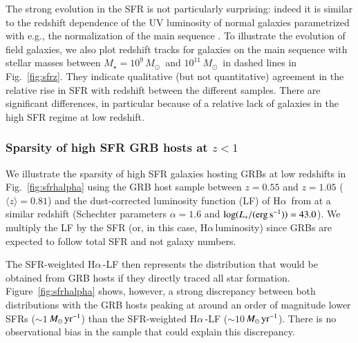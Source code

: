 \documentclass[traditabstract, longauth]{aa}
\newcommand{\ha}{H$\alpha$}
\newcommand{\Msun}{$M_\odot$}
\newcommand{\Msunyr}{$M_\odot\,\rm{yr}^{-1}$}
\begin{document}
The strong evolution in the SFR is not particularly surprising: indeed it is similar to the redshift dependence of the UV luminosity of normal galaxies parametrized with e.g., the normalization of the main sequence \citep[e.g.,][]{2011ApJ...742...96W, 2012ApJ...754L..29W}. To illustrate the evolution of field galaxies, we also plot redshift tracks for galaxies {on the main sequence} with stellar masses between $M_{\star}=10^{9}$\,\Msun\, and $10^{11}$\,\Msun\, in dashed lines in Fig.~\ref{fig:sfrz}. They indicate qualitative (but not quantitative) agreement in the relative rise in SFR with redshift between the different samples. There are significant differences, in particular because of a relative lack of galaxies in the high SFR regime at low redshift.

\subsubsection{Sparsity of high SFR GRB hosts at $z<1$}

 {We illustrate the sparsity of high SFR galaxies hosting GRBs at low redshifts in Fig.~\ref{fig:sfrhalpha} using the GRB host sample between $z=0.55$ and $z=1.05$ ($\langle z \rangle = 0.81$) and the dust-corrected luminosity function (LF) of \ha\, from \citet{2011ApJ...726..109L} at a similar redshift (Schechter parameters $\alpha=1.6$ and $\log(L_*/(\rm{erg\,s^{-1}}))=43.0$). We multiply the LF by the SFR (or, in this case, \ha\,luminosity) since GRBs are expected to follow total SFR and not galaxy numbers.}

 {The SFR-weighted \ha\,-LF then represents the distribution that would be obtained from GRB hosts if they directly traced all star formation. Figure~\ref{fig:sfrhalpha} shows, however, a strong discrepancy between both distributions \citep[see also][]{2013A&A...557A..34B} with the GRB hosts peaking at around an order of magnitude lower SFRs ($\sim1$\,\Msunyr) than the SFR-weighted \ha\,-LF ($\sim10$\,\Msunyr). There is no observational bias in the sample that could explain this discrepancy.}
\end{document}
